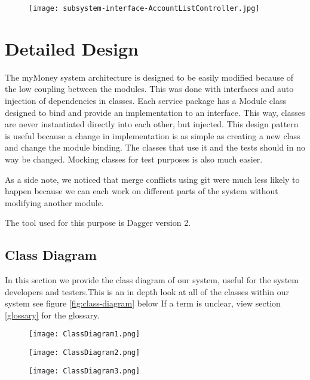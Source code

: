 \documentclass[12pt]{article}
\begin{document}
\begin{figure}[H]
\texttt{[image: subsystem-interface-AccountListController.jpg]}
\end{figure}

\clearpage

\section{Detailed Design} \label{sec:detail}

The myMoney system architecture is designed to be easily modified because of the low coupling between the modules. This was done with interfaces and auto injection of dependencies in classes. Each service package has a Module class designed to bind and provide an implementation to an interface. This way, classes are never instantiated directly into each other, but injected. This design pattern is useful because a change in implementation is as simple as creating a new class and change the module binding. The classes that use it and the tests should in no way be changed. Mocking classes for test purposes is also much easier.

As a side note, we noticed that merge conflicts using git were much less likely to happen because we can each work on different parts of the system without modifying another module.

The tool used for this purpose is Dagger version 2.

\subsection{Class Diagram}

In this section we provide the class diagram of our system, useful for the system developers and testers.This is an in depth look at all of the classes within our system see figure \ref{fig:class-diagram} below If a term is unclear, view section \ref{glossary} for the glossary.

\begin{figure}[H]
\texttt{[image: ClassDiagram1.png]}
\end{figure}

\begin{figure}[H]
\texttt{[image: ClassDiagram2.png]}
\end{figure}

\begin{figure}[H]
\texttt{[image: ClassDiagram3.png]}
\end{figure}
\end{document}
